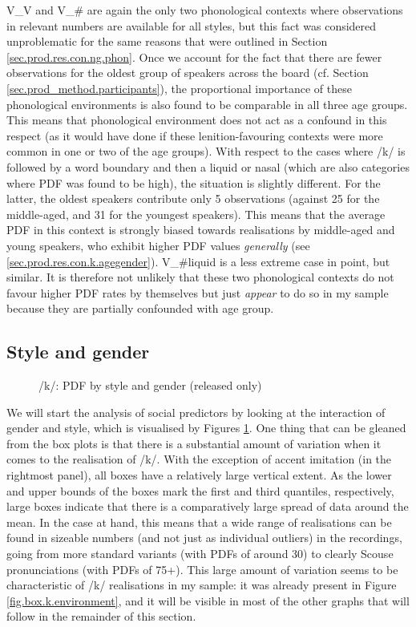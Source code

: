 V\_V and V\_\# are again the only two phonological contexts where observations in relevant numbers are available for all styles, but this fact was considered unproblematic for the same reasons that were outlined in Section \ref{sec.prod.res.con.ng.phon}.
Once we account for the fact that there are fewer observations for the oldest group of speakers across the board (cf. Section \ref{sec.prod_method.participants}), the proportional importance of these phonological environments is also found to be comparable in all three age groups.
This means that phonological environment does not act as a confound in this respect (as it would have done if these lenition-favouring contexts were more common in one or two of the age groups).
With respect to the cases where /k/ is followed by a word boundary and then a liquid or nasal (which are also categories where PDF was found to be high), the situation is slightly different.
For the latter, the oldest speakers contribute only 5 observations (against 25 for the middle-aged, and 31 for the youngest speakers).
This means that the average PDF in this context is strongly biased towards realisations by middle-aged and young speakers, who exhibit higher PDF values \emph{generally} (see \ref{sec.prod.res.con.k.agegender}).
V\_\#liquid is a less extreme case in point, but similar.
It is therefore not unlikely that these two phonological contexts do not favour higher PDF rates by themselves but just \emph{appear} to do so in my sample because they are partially confounded with age group.

\subsection{Style and gender}
\label{sec.prod.res.con.k.stylegender}

\begin{figure}[h]
	\centering
		\resizebox{.49\linewidth}{!}{} 
	\caption{/k/: PDF by style and gender (released only)}
	\label{fig.box.k.stylegender}
\end{figure}

We will start the analysis of social predictors by looking at the interaction of gender and style, which is visualised by Figures \ref{fig.box.k.stylegender}.
One thing that can be gleaned from the box plots is that there is a substantial amount of variation when it comes to the realisation of /k/.
With the exception of accent imitation (in the rightmost panel), all boxes have a relatively large vertical extent.
As the lower and upper bounds of the boxes mark the first and third quantiles, respectively, large boxes indicate that there is a comparatively large spread of data around the mean.
In the case at hand, this means that a wide range of realisations can be found in sizeable numbers (and not just as individual outliers) in the recordings, going from more standard variants (with PDFs of around 30) to clearly Scouse pronunciations (with PDFs of 75+).
This large amount of variation seems to be characteristic of /k/ realisations in my sample: it was already present in Figure \ref{fig.box.k.environment}, and it will be visible in most of the other graphs that will follow in the remainder of this section.

